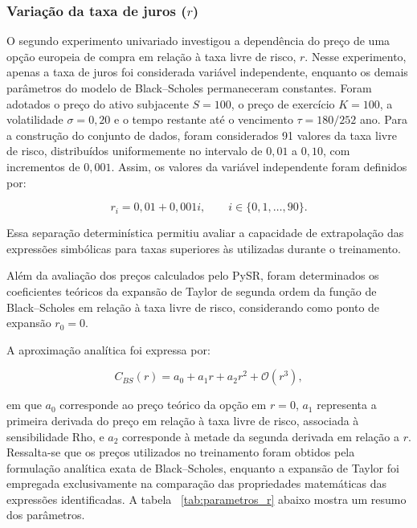 \subsubsection*{Variação da taxa de juros ($r$)}
O segundo experimento univariado investigou a dependência
do preço de uma opção europeia de compra em relação à taxa
livre de risco, $r$. Nesse experimento, apenas a taxa de
juros foi considerada variável independente, enquanto
os demais parâmetros do modelo de Black--Scholes
permaneceram constantes. Foram adotados o preço do ativo subjacente $S=100$,
o preço de exercício $K=100$, a volatilidade
$\sigma=0{,}20$ e o tempo restante até o vencimento
$\tau=180/252$ ano. Para a construção do conjunto de dados, foram
considerados 91 valores da taxa livre de risco,
distribuídos uniformemente no intervalo de
$0{,}01$ a $0{,}10$, com incrementos de $0{,}001$.
Assim, os valores da variável independente
foram definidos por:

\begin{equation}
r_i = 0{,}01 + 0{,}001i,
\qquad i \in \{0,1,\ldots,90\}.
\end{equation}

Essa separação determinística permitiu avaliar
a capacidade de extrapolação das expressões
simbólicas para taxas superiores às utilizadas
durante o treinamento.

Além da avaliação dos preços calculados pelo
PySR, foram determinados os coeficientes
teóricos da expansão de Taylor de segunda
ordem da função de Black--Scholes em relação
à taxa livre de risco, considerando como
ponto de expansão $r_0=0$.

A aproximação analítica foi expressa por:

\begin{equation}
C_{BS}(r) =
a_0 + a_1r + a_2r^2 + \mathcal{O}(r^3),
\end{equation}

em que $a_0$ corresponde ao preço teórico
da opção em $r=0$, $a_1$ representa a
primeira derivada do preço em relação à
taxa livre de risco, associada à sensibilidade
Rho, e $a_2$ corresponde à metade da
segunda derivada em relação a $r$. Ressalta-se que os preços utilizados no treinamento
foram obtidos pela formulação analítica exata
de Black--Scholes, enquanto a expansão de Taylor
foi empregada exclusivamente na comparação
das propriedades matemáticas das expressões
identificadas. A tabela ~\ref{tab:parametros_r} abaixo mostra um resumo dos parâmetros.


